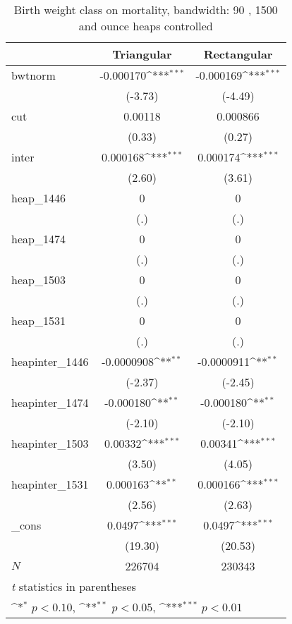 \begin{table}[htbp]\centering
\def\sym#1{\ifmmode^{#1}\else\(^{#1}\)\fi}
\caption{Birth weight class on mortality, bandwidth: 90 , 1500 and ounce heaps controlled}
\begin{tabular}{l*{2}{c}}
\hline\hline
            &\multicolumn{1}{c}{Triangular}&\multicolumn{1}{c}{Rectangular}\\
\hline
bwtnorm     &   -0.000170\sym{***}&   -0.000169\sym{***}\\
            &     (-3.73)         &     (-4.49)         \\
[1em]
cut         &     0.00118         &    0.000866         \\
            &      (0.33)         &      (0.27)         \\
[1em]
inter       &    0.000168\sym{***}&    0.000174\sym{***}\\
            &      (2.60)         &      (3.61)         \\
[1em]
heap\_1446   &           0         &           0         \\
            &         (.)         &         (.)         \\
[1em]
heap\_1474   &           0         &           0         \\
            &         (.)         &         (.)         \\
[1em]
heap\_1503   &           0         &           0         \\
            &         (.)         &         (.)         \\
[1em]
heap\_1531   &           0         &           0         \\
            &         (.)         &         (.)         \\
[1em]
heapinter\_1446&  -0.0000908\sym{**} &  -0.0000911\sym{**} \\
            &     (-2.37)         &     (-2.45)         \\
[1em]
heapinter\_1474&   -0.000180\sym{**} &   -0.000180\sym{**} \\
            &     (-2.10)         &     (-2.10)         \\
[1em]
heapinter\_1503&     0.00332\sym{***}&     0.00341\sym{***}\\
            &      (3.50)         &      (4.05)         \\
[1em]
heapinter\_1531&    0.000163\sym{**} &    0.000166\sym{***}\\
            &      (2.56)         &      (2.63)         \\
[1em]
\_cons      &      0.0497\sym{***}&      0.0497\sym{***}\\
            &     (19.30)         &     (20.53)         \\
\hline
\(N\)       &      226704         &      230343         \\
\hline\hline
\multicolumn{3}{l}{\footnotesize \textit{t} statistics in parentheses}\\
\multicolumn{3}{l}{\footnotesize \sym{*} \(p<0.10\), \sym{**} \(p<0.05\), \sym{***} \(p<0.01\)}\\
\end{tabular}
\end{table}
